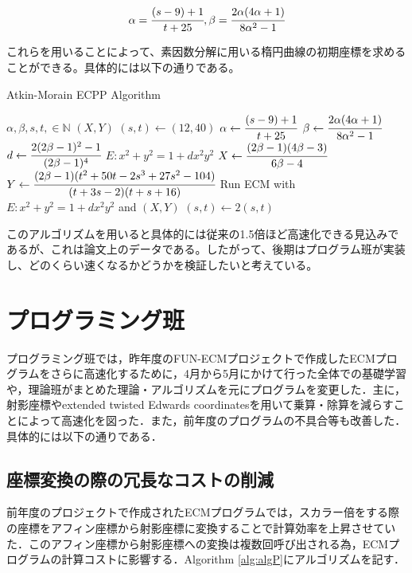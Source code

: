 \documentclass[openany,11pt,papersize]{jsbook}
\begin{document}
\begin{center}
\begin{equation}
\alpha =\cfrac{(s-9)+1}{t+25}  ,  \beta = \cfrac{2\alpha (4\alpha +1)}{8\alpha^2-1}
\end{equation}
\end{center}
これらを用いることによって、素因数分解に用いる楕円曲線の初期座標を求めることができる。具体的には以下の通りである。

\begin{algorithm}[h]                   
\caption{Atkin-Morain ECPP Algorithm}
\label{alg ECPP}                          
\begin{algorithmic}                  
\REQUIRE $\alpha,\beta,s,t,\in \mathbb{N}$
\ENSURE $(X,Y)$
\STATE $(s,t) \leftarrow(12,40)$
\STATE $\alpha \leftarrow \cfrac{(s-9)+1}{t+25}$
\STATE $\beta \leftarrow \cfrac{2\alpha (4\alpha +1)}{8\alpha^2-1}$
\STATE $d \leftarrow \cfrac{2(2\beta -1)^2-1}{(2\beta -1)^4}$
\STATE $E:x^2+y^2=1+dx^2y^2$
\STATE $X \leftarrow \cfrac{(2\beta -1)(4\beta -3)}{6\beta -4}$
\STATE $Y \leftarrow \cfrac{(2\beta-1)(t^2+50t-2s^3+27s^2-104)}{(t+3s-2)(t+s+16)}$
\STATE Run ECM with $E:x^2+y^2=1+dx^2y^2$ and $(X,Y)$
\STATE $(s,t) \leftarrow 2(s,t)$
\ENDWHILE
\end{algorithmic}
\end{algorithm}

このアルゴリズムを用いると具体的には従来の1.5倍ほど高速化できる見込みであるが、これは論文上のデータである。したがって、後期はプログラム班が実装し、どのくらい速くなるかどうかを検証したいと考えている。


\section{プログラミング班}
プログラミング班では，昨年度のFUN-ECMプロジェクトで作成したECMプログラムをさらに高速化するために，4月から5月にかけて行った全体での基礎学習や，理論班がまとめた理論・アルゴリズムを元にプログラムを変更した．主に，射影座標やextended twisted Edwards coordinatesを用いて乗算・除算を減らすことによって高速化を図った．また，前年度のプログラムの不具合等も改善した．具体的には以下の通りである．


\subsection{座標変換の際の冗長なコストの削減}\label{sec:alg1}
前年度のプロジェクトで作成されたECMプログラムでは，スカラー倍をする際の座標をアフィン座標から射影座標に変換することで計算効率を上昇させていた．このアフィン座標から射影座標への変換は複数回呼び出される為，ECMプログラムの計算コストに影響する．Algorithm \ref{alg:algP}にアルゴリズムを記す．
\end{document}

